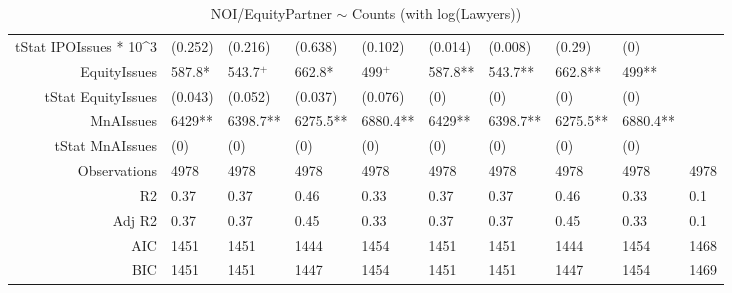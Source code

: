 \begin{table}[ht]
\begin{tabular}{rlllllllll}
  tStat IPOIssues * 10^3 & (0.252) & (0.216) & (0.638) & (0.102) & (0.014) & (0.008) & (0.29) & (0) &  \\ 
  EquityIssues & 587.8* & 543.7$^{+}$ & 662.8* & 499$^{+}$ & 587.8** & 543.7** & 662.8** & 499** &  \\ 
  tStat EquityIssues & (0.043) & (0.052) & (0.037) & (0.076) & (0) & (0) & (0) & (0) &  \\ 
  MnAIssues & 6429** & 6398.7** & 6275.5** & 6880.4** & 6429** & 6398.7** & 6275.5** & 6880.4** &  \\ 
  tStat MnAIssues & (0) & (0) & (0) & (0) & (0) & (0) & (0) & (0) &  \\ 
  Observations & 4978 & 4978 & 4978 & 4978 & 4978 & 4978 & 4978 & 4978 & 4978 \\ 
  R2 & 0.37 & 0.37 & 0.46 & 0.33 & 0.37 & 0.37 & 0.46 & 0.33 & 0.1 \\ 
  Adj R2 & 0.37 & 0.37 & 0.45 & 0.33 & 0.37 & 0.37 & 0.45 & 0.33 & 0.1 \\ 
  AIC & 1451 & 1451 & 1444 & 1454 & 1451 & 1451 & 1444 & 1454 & 1468 \\ 
  BIC & 1451 & 1451 & 1447 & 1454 & 1451 & 1451 & 1447 & 1454 & 1469 \\ 
   \hline
\end{tabular}
\caption{NOI/EquityPartner $\sim$ Counts (with log(Lawyers))} 
\end{table}
